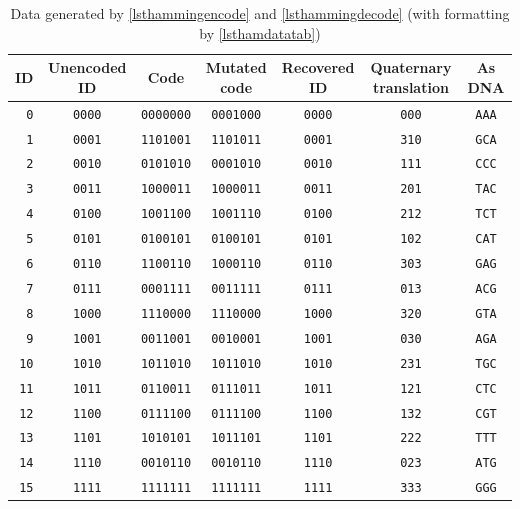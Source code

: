 \documentclass[a4paper,11pt]{article}
\begin{document}
\begin{table}[H]
\begin{center}
\begin{tabular}{rcccccc} \toprule
ID & Unencoded ID & Code & Mutated code & Recovered ID & Quaternary translation & As DNA \\ \midrule
\texttt{0} & \texttt{0000} & \texttt{0000000} & \texttt{0001000} & \texttt{0000} & \texttt{000} & \texttt{AAA} \\
\texttt{1} & \texttt{0001} & \texttt{1101001} & \texttt{1101011} & \texttt{0001} & \texttt{310} & \texttt{GCA} \\
\texttt{2} & \texttt{0010} & \texttt{0101010} & \texttt{0001010} & \texttt{0010} & \texttt{111} & \texttt{CCC} \\
\texttt{3} & \texttt{0011} & \texttt{1000011} & \texttt{1000011} & \texttt{0011} & \texttt{201} & \texttt{TAC} \\
\texttt{4} & \texttt{0100} & \texttt{1001100} & \texttt{1001110} & \texttt{0100} & \texttt{212} & \texttt{TCT} \\
\texttt{5} & \texttt{0101} & \texttt{0100101} & \texttt{0100101} & \texttt{0101} & \texttt{102} & \texttt{CAT} \\
\texttt{6} & \texttt{0110} & \texttt{1100110} & \texttt{1000110} & \texttt{0110} & \texttt{303} & \texttt{GAG} \\
\texttt{7} & \texttt{0111} & \texttt{0001111} & \texttt{0011111} & \texttt{0111} & \texttt{013} & \texttt{ACG} \\
\texttt{8} & \texttt{1000} & \texttt{1110000} & \texttt{1110000} & \texttt{1000} & \texttt{320} & \texttt{GTA} \\
\texttt{9} & \texttt{1001} & \texttt{0011001} & \texttt{0010001} & \texttt{1001} & \texttt{030} & \texttt{AGA} \\
\texttt{10} & \texttt{1010} & \texttt{1011010} & \texttt{1011010} & \texttt{1010} & \texttt{231} & \texttt{TGC} \\
\texttt{11} & \texttt{1011} & \texttt{0110011} & \texttt{0111011} & \texttt{1011} & \texttt{121} & \texttt{CTC} \\
\texttt{12} & \texttt{1100} & \texttt{0111100} & \texttt{0111100} & \texttt{1100} & \texttt{132} & \texttt{CGT} \\
\texttt{13} & \texttt{1101} & \texttt{1010101} & \texttt{1011101} & \texttt{1101} & \texttt{222} & \texttt{TTT} \\
\texttt{14} & \texttt{1110} & \texttt{0010110} & \texttt{0010110} & \texttt{1110} & \texttt{023} & \texttt{ATG} \\
\texttt{15} & \texttt{1111} & \texttt{1111111} & \texttt{1111111} & \texttt{1111} & \texttt{333} & \texttt{GGG} \\
\bottomrule
\end{tabular}
\end{center}
\caption{Data generated by \ref{lsthammingencode} and \ref{lsthammingdecode} (with formatting by
         \ref{lsthamdatatab})}
 \label{tabhamdata}
\end{table}
\end{document}

